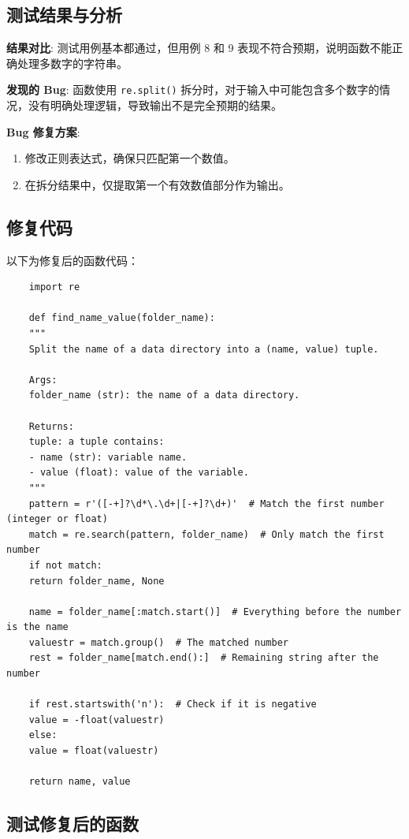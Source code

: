 \documentclass{article}
\begin{document}
\subsection*{测试结果与分析}

\textbf{结果对比}: 测试用例基本都通过，但用例 8 和 9 表现不符合预期，说明函数不能正确处理多数字的字符串。

\textbf{发现的 Bug}: 函数使用 \texttt{re.split()} 拆分时，对于输入中可能包含多个数字的情况，没有明确处理逻辑，导致输出不是完全预期的结果。

\textbf{Bug 修复方案}:
\begin{enumerate}
	\item 修改正则表达式，确保只匹配第一个数值。
	\item 在拆分结果中，仅提取第一个有效数值部分作为输出。
\end{enumerate}

\subsection*{修复代码}

以下为修复后的函数代码：

\begin{verbatim}
	import re
	
	def find_name_value(folder_name):
	"""
	Split the name of a data directory into a (name, value) tuple.
	
	Args:
	folder_name (str): the name of a data directory.
	
	Returns:
	tuple: a tuple contains:
	- name (str): variable name.
	- value (float): value of the variable.
	"""
	pattern = r'([-+]?\d*\.\d+|[-+]?\d+)'  # Match the first number (integer or float)
	match = re.search(pattern, folder_name)  # Only match the first number
	if not match:
	return folder_name, None
	
	name = folder_name[:match.start()]  # Everything before the number is the name
	valuestr = match.group()  # The matched number
	rest = folder_name[match.end():]  # Remaining string after the number
	
	if rest.startswith('n'):  # Check if it is negative
	value = -float(valuestr)
	else:
	value = float(valuestr)
	
	return name, value
\end{verbatim}

\subsection*{测试修复后的函数}
\end{document}
